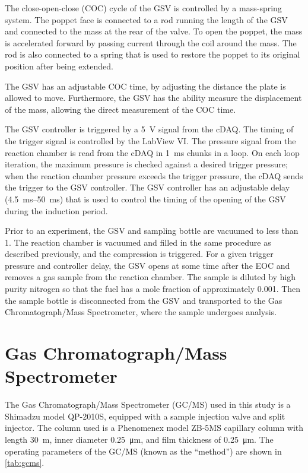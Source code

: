 \documentclass[12pt, letterpaper]{article}
\begin{document}
The close-open-close (COC) cycle of the GSV is controlled by a mass-spring
system. The poppet face is connected to a rod running the length of the
GSV and connected to the mass at the rear of the valve. To open the poppet,
the mass is accelerated forward by passing current through the coil around
the mass. The rod is also
connected to a spring that is used to restore the poppet to its original
position after being extended.

The GSV has an adjustable COC time, by adjusting the
distance the plate is allowed to move. Furthermore, the GSV has the ability
measure the displacement of the mass, allowing the direct measurement of
the COC time.

The GSV controller is triggered by a \SI{5}{\volt} signal from the cDAQ.
The timing of the trigger signal is controlled by the LabView VI. The pressure
signal from the reaction chamber is read from the cDAQ in \SI{1}{\milli\second}
chunks in a loop. On each loop iteration, the maximum pressure is checked
against a desired trigger pressure; when the reaction chamber pressure exceeds
the trigger pressure, the cDAQ sends the trigger to the GSV controller. The
GSV controller has an adjustable delay (\SIrange{4.5}{50}{\milli\second}) that
is used to control the timing of the opening of the GSV during the induction period.

Prior to an experiment, the GSV and sampling bottle are vacuumed to less
than \SI{1}{\torr}. The reaction chamber is vacuumed and filled in the same
procedure as described previously, and the compression is triggered. For a given
trigger pressure and controller delay, the GSV opens at some time after the EOC
and removes a gas sample from the reaction chamber. The sample is diluted by
high purity nitrogen so that the fuel has a mole fraction of approximately
\num{0.001}. Then the sample bottle is disconnected from the GSV and transported
to the Gas Chromatograph/Mass Spectrometer, where the sample undergoes analysis.

\section{Gas Chromatograph/Mass Spectrometer}
\label{sec:gcms}

The Gas Chromatograph/Mass Spectrometer (GC/MS) used in this study is a
Shimadzu model QP-2010S, equipped with a sample injection valve and split
injector. The column used is a Phenomenex model ZB-5MS capillary column
with length \SI{30}{\meter}, inner diameter \SI{0.25}{\micro\meter}, and film
thickness of \SI{0.25}{\micro\meter}. The operating parameters of the GC/MS
(known as the ``method'') are shown in \autoref{tab:gcms}.
\end{document}
